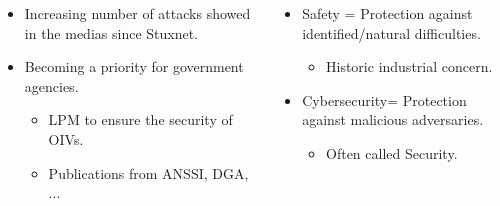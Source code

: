 \documentclass{beamer}
\newcommand{\Cybersec}{Cybersecurity\xspace}
\begin{document}
\begin{frame}[fragile]{}
\begin{columns}[T]
\begin{column}{.49\textwidth}
\begin{tcolorbox}[adjusted title={\centering\large Industrial Systems}]
                \vspace{.4em}
                \begin{itemize}
                    \item Increasing number of attacks showed in the medias since Stuxnet.
                    \item Becoming a priority for government agencies.
                    \begin{itemize}
                        \item LPM to ensure the security of OIVs.
                        \item Publications from ANSSI, DGA, ...
                    \end{itemize}
                \end{itemize}
            \end{tcolorbox}
        \end{column}
        \begin{column}{.49\textwidth}
            \begin{tcolorbox}[adjusted title={\centering\large Security concepts}]
                \begin{itemize}
                    \item Safety = Protection against identified/natural difficulties.
                    \begin{itemize}
                        \item Historic industrial concern.
                    \end{itemize}
                    \item \Cybersec = Protection against malicious adversaries.
                    \begin{itemize}
                        \item Often called Security.
                    \end{itemize}
                \end{itemize}


\end{tcolorbox}
\end{column}
\end{columns}
\end{frame}
\end{document}
